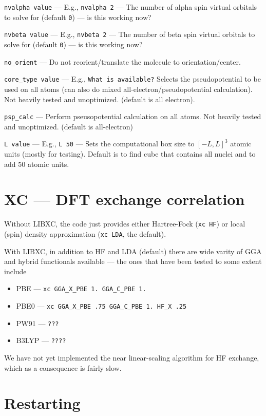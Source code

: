 \documentclass[letterpaper]{book}
\begin{document}
{\tt nvalpha value} --- E.g., {\tt nvalpha 2} --- The number of alpha spin virtual orbitals to solve for (default {\tt 0}) --- is this working now?

{\tt nvbeta value} --- E.g., {\tt nvbeta 2} --- The number of beta spin virtual orbitals to solve for (default {\tt 0}) --- is this working now?

{\tt no\_orient} --- Do not reorient/translate the molecule to orientation/center.

{\tt core\_type value} --- E.g., {\tt What is available?} Selects the pseudopotential to be used on all atoms (can also do mixed all-electron/pseudopotential calculation).  Not heavily tested and unoptimized. (default is all electron).

{\tt psp\_calc} --- Perform pseusopotential calculation on all atoms.  Not heavily tested and unoptimized. (default is all-electron)

{\tt L value} --- E.g., {\tt L 50} --- Sets the computational box size to $[-L,L]^3$ atomic units (mostly for testing).  Default is to find cube that contains all nuclei and to add 50 atomic units.

\section{XC --- DFT exchange correlation}

Without LIBXC, the code just provides either Hartree-Fock ({\tt xc HF}) or local (spin) density approximation ({\tt xc LDA}, the default).

With LIBXC, in addition to HF and LDA (default) there are wide varity of GGA and hybrid functionals available --- the ones that have been tested to some extent include
\begin{itemize}
\item PBE --- \verb+xc GGA_X_PBE 1. GGA_C_PBE 1.+
\item PBE0 --- \verb+xc GGA_X_PBE .75 GGA_C_PBE 1. HF_X .25+
\item PW91 --- \verb+???+
\item B3LYP --- \verb+????+
  
\end{itemize}

We have not yet implemented the near linear-scaling algorithm for HF exchange, which as a consequence is fairly slow.

\section{Restarting}
\end{document}
